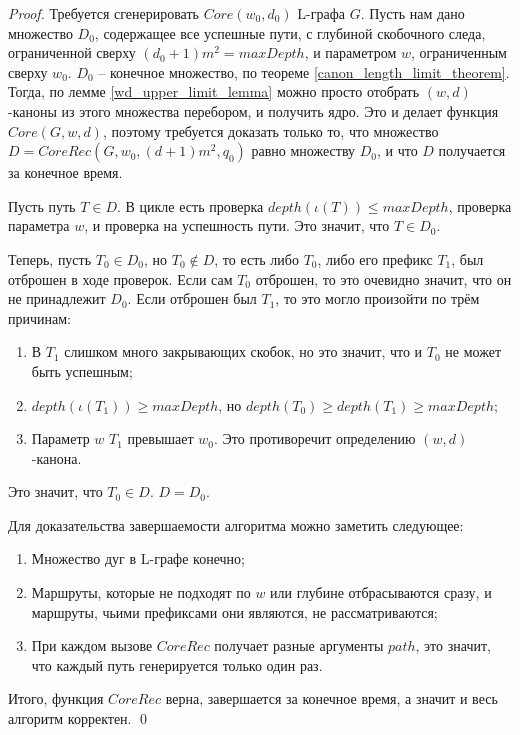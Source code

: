 \begin{proof}
    Требуется сгенерировать $Core(w_0, d_0)$ L-графа $G$. 
    Пусть нам дано множество $D_0$, содержащее все успешные пути, 
    с глубиной скобочного следа, ограниченной сверху $(d_0+1)m^2 = maxDepth$, 
    и параметром $w$, ограниченным сверху $w_0$. 
    $D_0$ -- конечное множество, по теореме \ref{canon_length_limit_theorem}.
    Тогда, по лемме \ref{wd_upper_limit_lemma} можно просто отобрать $(w,d)$-каноны из этого множества перебором, 
    и получить ядро. 
    Это и делает функция $Core(G, w, d)$, поэтому требуется доказать только то, 
    что множество $D = CoreRec(G, w_0, (d+1)m^2, q_0)$ равно множеству $D_0$, и что $D$ получается за конечное время.

    Пусть путь $T \in D$. В цикле есть проверка $depth(\iota(T)) \leq maxDepth$, проверка параметра $w$, и проверка на успешность пути.
    Это значит, что $T \in D_0$.

    Теперь, пусть $T_0 \in D_0$, но $T_0 \notin D$, то есть либо $T_0$, либо его префикс $T_1$, был отброшен в ходе проверок.
    Если сам $T_0$ отброшен, то это очевидно значит, что он не принадлежит $D_0$.
    Если отброшен был $T_1$, то это могло произойти по трём причинам:
    \begin{enumerate}
        \item В $T_1$ слишком много закрывающих скобок, но это значит, что и $T_0$ не может быть успешным;
        \item $depth(\iota(T_1)) \ge maxDepth$, но $depth(T_0) \geq depth(T_1) \ge maxDepth$;
        \item Параметр $w$ $T_1$ превышает $w_0$. Это противоречит определению $(w,d)$-канона.
    \end{enumerate}
    Это значит, что $T_0 \in D$. $D = D_0$.

    Для доказательства завершаемости алгоритма можно заметить следующее:
    \begin{enumerate}
        \item Множество дуг в L-графе конечно;
        \item Маршруты, которые не подходят по $w$ или глубине отбрасываются сразу, и маршруты, чьими префиксами они являются, не рассматриваются;
        \item При каждом вызове $CoreRec$ получает разные аргументы $path$, это значит, что каждый путь генерируется только один раз.
    \end{enumerate}

    Итого, функция $CoreRec$ верна, завершается за конечное время, а значит и весь алгоритм корректен. \qed
\end{proof}

